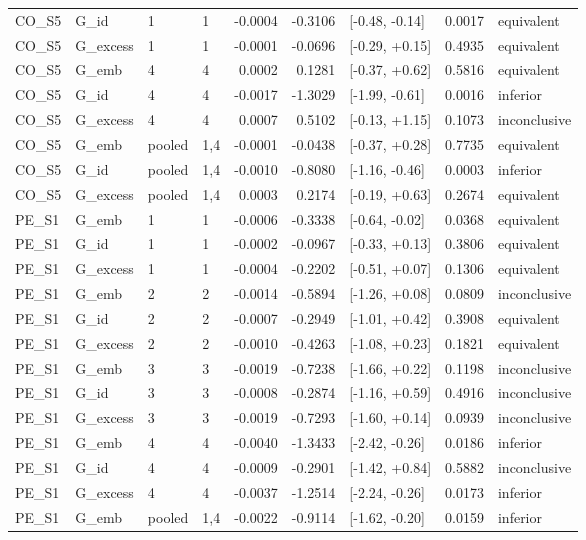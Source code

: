 \begin{tabular}{llllrrlrl}
CO\_S5 & G\_id & 1 & 1 & -0.0004 & -0.3106 & [-0.48, -0.14] & 0.0017 & equivalent \\
CO\_S5 & G\_excess & 1 & 1 & -0.0001 & -0.0696 & [-0.29, +0.15] & 0.4935 & equivalent \\
CO\_S5 & G\_emb & 4 & 4 & 0.0002 & 0.1281 & [-0.37, +0.62] & 0.5816 & equivalent \\
CO\_S5 & G\_id & 4 & 4 & -0.0017 & -1.3029 & [-1.99, -0.61] & 0.0016 & inferior \\
CO\_S5 & G\_excess & 4 & 4 & 0.0007 & 0.5102 & [-0.13, +1.15] & 0.1073 & inconclusive \\
CO\_S5 & G\_emb & pooled & 1,4 & -0.0001 & -0.0438 & [-0.37, +0.28] & 0.7735 & equivalent \\
CO\_S5 & G\_id & pooled & 1,4 & -0.0010 & -0.8080 & [-1.16, -0.46] & 0.0003 & inferior \\
CO\_S5 & G\_excess & pooled & 1,4 & 0.0003 & 0.2174 & [-0.19, +0.63] & 0.2674 & equivalent \\
PE\_S1 & G\_emb & 1 & 1 & -0.0006 & -0.3338 & [-0.64, -0.02] & 0.0368 & equivalent \\
PE\_S1 & G\_id & 1 & 1 & -0.0002 & -0.0967 & [-0.33, +0.13] & 0.3806 & equivalent \\
PE\_S1 & G\_excess & 1 & 1 & -0.0004 & -0.2202 & [-0.51, +0.07] & 0.1306 & equivalent \\
PE\_S1 & G\_emb & 2 & 2 & -0.0014 & -0.5894 & [-1.26, +0.08] & 0.0809 & inconclusive \\
PE\_S1 & G\_id & 2 & 2 & -0.0007 & -0.2949 & [-1.01, +0.42] & 0.3908 & equivalent \\
PE\_S1 & G\_excess & 2 & 2 & -0.0010 & -0.4263 & [-1.08, +0.23] & 0.1821 & equivalent \\
PE\_S1 & G\_emb & 3 & 3 & -0.0019 & -0.7238 & [-1.66, +0.22] & 0.1198 & inconclusive \\
PE\_S1 & G\_id & 3 & 3 & -0.0008 & -0.2874 & [-1.16, +0.59] & 0.4916 & inconclusive \\
PE\_S1 & G\_excess & 3 & 3 & -0.0019 & -0.7293 & [-1.60, +0.14] & 0.0939 & inconclusive \\
PE\_S1 & G\_emb & 4 & 4 & -0.0040 & -1.3433 & [-2.42, -0.26] & 0.0186 & inferior \\
PE\_S1 & G\_id & 4 & 4 & -0.0009 & -0.2901 & [-1.42, +0.84] & 0.5882 & inconclusive \\
PE\_S1 & G\_excess & 4 & 4 & -0.0037 & -1.2514 & [-2.24, -0.26] & 0.0173 & inferior \\
PE\_S1 & G\_emb & pooled & 1,4 & -0.0022 & -0.9114 & [-1.62, -0.20] & 0.0159 & inferior \\

\end{tabular}
